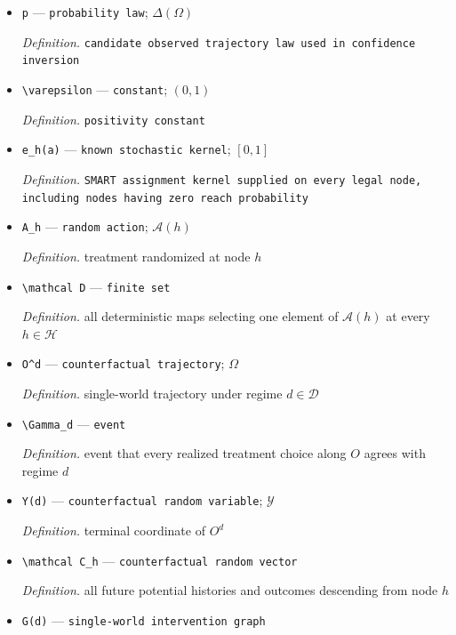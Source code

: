 \documentclass{article}
\begin{document}
\begin{itemize}
  \item \texttt{p} --- \texttt{probability law}; \(\Delta(\Omega)\)
  \par\smallskip\noindent\emph{Definition.} \texttt{candidate observed trajectory law used in confidence inversion}
  \item \texttt{\textbackslash{}\allowbreak{}varepsilon} --- \texttt{constant}; \((0,1)\)
  \par\smallskip\noindent\emph{Definition.} \texttt{positivity constant}
  \item \texttt{e\_\allowbreak{}h(a)} --- \texttt{known stochastic kernel}; \([0,1]\)
  \par\smallskip\noindent\emph{Definition.} \texttt{SMART assignment kernel supplied on every legal node,\allowbreak{} including nodes having zero reach probability}
  \item \texttt{A\_\allowbreak{}h} --- \texttt{random action}; \(\mathcal A(h)\)
  \par\smallskip\noindent\emph{Definition.} treatment randomized at node \(h\)
  \item \texttt{\textbackslash{}\allowbreak{}mathcal D} --- \texttt{finite set}
  \par\smallskip\noindent\emph{Definition.} all deterministic maps selecting one element of \(\mathcal A(h)\) at every \(h\in\mathcal H\)
  \item \texttt{O\textasciicircum{}d} --- \texttt{counterfactual trajectory}; \(\Omega\)
  \par\smallskip\noindent\emph{Definition.} single-world trajectory under regime \(d\in\mathcal D\)
  \item \texttt{\textbackslash{}\allowbreak{}Gamma\_\allowbreak{}d} --- \texttt{event}
  \par\smallskip\noindent\emph{Definition.} event that every realized treatment choice along \(O\) agrees with regime \(d\)
  \item \texttt{Y(d)} --- \texttt{counterfactual random variable}; \(\mathcal Y\)
  \par\smallskip\noindent\emph{Definition.} terminal coordinate of \(O^d\)
  \item \texttt{\textbackslash{}\allowbreak{}mathcal C\_\allowbreak{}h} --- \texttt{counterfactual random vector}
  \par\smallskip\noindent\emph{Definition.} all future potential histories and outcomes descending from node \(h\)
  \item \texttt{G(d)} --- \texttt{single-\allowbreak{}world intervention graph}

\end{itemize}
\end{document}
